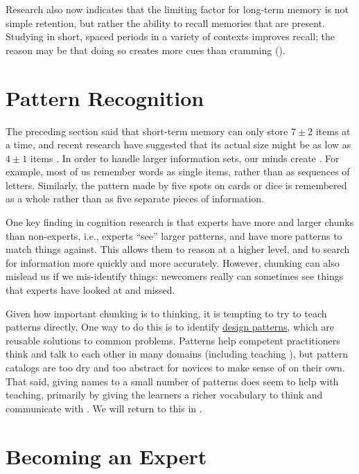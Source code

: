 Research also now indicates that the limiting factor for long-term
memory is not simple retention, but rather the ability to recall
memories that are present.  Studying in short, spaced periods in a
variety of contexts improves recall; the reason may be that doing so
creates more cues than cramming ().

\section{Pattern Recognition}\label{s:memory-pattern}

The preceding section said that short-term memory can only store
$7{\pm}2$ items at a time, and recent research have suggested that its
actual size might be as low as $4{\pm}1$ items \cite{Dida2016}.  In
order to handle larger information sets, our minds create
. For example, most of us remember words
as single items, rather than as sequences of letters. Similarly, the
pattern made by five spots on cards or dice is remembered as a whole
rather than as five separate pieces of information.

One key finding in cognition research is that experts have more and
larger chunks than non-experts, i.e., experts ``see'' larger patterns,
and have more patterns to match things against. This allows them to
reason at a higher level, and to search for information more quickly
and more accurately.  However, chunking can also mislead us if we
mis-identify things: newcomers really can sometimes see things that
experts have looked at and missed.

Given how important chunking is to thinking, it is tempting to try to
teach patterns directly.  One way to do this is to identify
\href{https://en.wikipedia.org/wiki/Software_design_pattern}{design
  patterns}, which are reusable solutions to common problems. Patterns
help competent practitioners think and talk to each other in many
domains (including teaching \cite{Berg2012}), but pattern catalogs are
too dry and too abstract for novices to make sense of on their own.
That said, giving names to a small number of patterns does seem to
help with teaching, primarily by giving the learners a richer
vocabulary to think and communicate with
\cite{Kuit2004,Byck2005,Saja2006}.  We will return to this in
.

\section{Becoming an Expert}\label{s:memory-becoming-expert}

